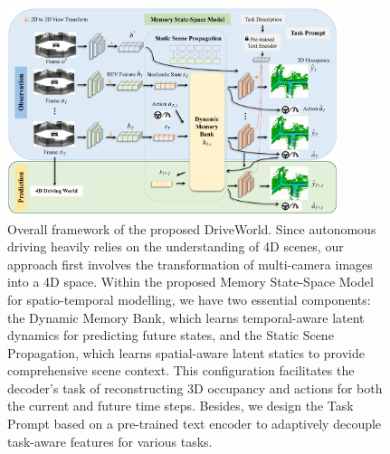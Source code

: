 \begin{figure}[t]
	\centering
	\includegraphics[width=0.86\textwidth]{figures/flowchart}
	\caption{\small{Overall framework of the proposed DriveWorld. Since autonomous driving heavily relies on the understanding of 4D scenes, our approach first involves the transformation of multi-camera images into a 4D space. Within the proposed Memory State-Space Model for spatio-temporal modelling, we have two essential components: the Dynamic Memory Bank, which learns temporal-aware latent dynamics for predicting future states, and the Static Scene Propagation, which learns spatial-aware latent statics to provide comprehensive scene context. This configuration facilitates the decoder's task of reconstructing 3D occupancy and actions for both the current and future time steps. Besides, we design the Task Prompt based on a pre-trained text encoder to adaptively decouple task-aware features for various tasks.}
	}
	\label{fig:flowchart}
\end{figure}
